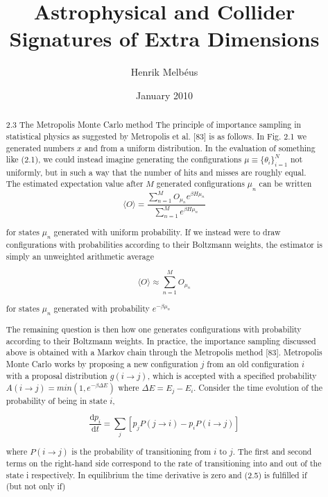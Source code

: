 \documentclass[nocoverpage,swedish,g5paper]{thesis}
\title{Astrophysical and Collider Signatures of Extra Dimensions}
\author{Henrik Melb\'eus}
\date{January 2010}
\begin{document}

\begin{abstract}

2.3 The Metropolis Monte Carlo method
The principle of importance sampling in statistical physics as suggested by
Metropolis et al. [83] is as follows. In Fig. 2.1 we generated numbers $x$ and from a uniform distribution. In the evaluation of something like (2.1), we could instead imagine generating the configurations $ \mu \equiv  \{ \theta_i \}^N_{i=1}$ not uniformly, but in such a way that the number of hits and misses are roughly equal. The estimated expectation value after $M$ generated configurations $\mu_n$ can be written
\begin{equation}
	\langle O \rangle = \frac{\sum^{M}_{n = 1} O_{\mu_n} e^{ \beta H \mu_n}}{\sum^{M}_{n = 1} e^{ \beta H \mu_n}}
\end{equation}

for states $\mu_n$ generated with uniform probability.
If we instead were to draw configurations with probabilities according to their Boltzmann weights, the estimator is simply an unweighted arithmetic
average

\begin{equation}
	\langle O \rangle \approx \sum^{M}_{n = 1} O_{\mu_n}
\end{equation}

for states $\mu_n$ generated with probability $e^{-\beta \mu_n}$

The remaining question is then how one generates configurations with probability according to their Boltzmann weights.
In practice, the importance sampling discussed above is obtained with a Markov chain through the Metropolis method [83]. Metropolis Monte Carlo works by proposing a new configuration $j$ from an old configuration $i$ with a proposal distribution $g(i \to j)$, which is accepted with a specified probability $A(i \to j) = min(1, e^{-\beta \Delta E})$ where  $\Delta E = E_j - E_i$. Consider the time evolution of the probability of being in state $i$,

\begin{equation}
	\frac{\mathrm d p_i}{\mathrm d t} =\sum_j [ p_j P(j \to i) - p_i P(i \to j)]
\end{equation}
 
where $P(i \to j)$ is the probability of transitioning from $i$ to $j$. The first and second terms on the right-hand side correspond to the rate of transitioning into and out of the state i respectively. In equilibrium the time derivative is zero and (2.5) is fulfilled if (but not only if)


\end{abstract}
\end{document}
